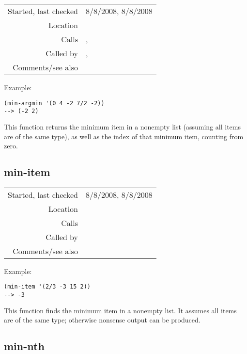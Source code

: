 \vspace{0.3cm}
\begin{tabular}{r|p{8cm}}
Started, last checked & 8/8/2008, 8/8/2008 \\
Location & \nameref{sec:sort-by} \\
Calls & \nameref{fun:index-item-1st-occurs}, \nameref{fun:min-item} \\
Called by & \nameref{fun:sort-by-col-asc}, \nameref{fun:sort-items-asc} \\
Comments/see also & \nameref{fun:max-argmax}
\end{tabular}

\vspace{0.5cm}
\noindent Example:
\begin{verbatim}
(min-argmin '(0 4 -2 7/2 -2))
--> (-2 2)
\end{verbatim}

\noindent This function returns the minimum item in a
nonempty list (assuming all items are of the same
type), as well as the index of that minimum item, 
counting from zero.


\subsection*{min-item}\label{fun:min-item}

\vspace{0.3cm}
\begin{tabular}{r|p{8cm}}
Started, last checked & 8/8/2008, 8/8/2008 \\
Location & \nameref{sec:sort-by} \\
Calls & \\
Called by & \nameref{fun:min-argmin} \\
Comments/see also & \nameref{fun:max-item}
\end{tabular}

\vspace{0.5cm}
\noindent Example:
\begin{verbatim}
(min-item '(2/3 -3 15 2))
--> -3
\end{verbatim}

\noindent This function finds the minimum item in a
nonempty list. It assumes all items are of the same
type; otherwise nonsense output can be produced.


\subsection*{min-nth}\label{fun:min-nth}

